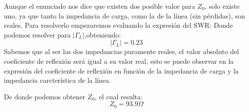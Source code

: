 Aunque el enunciado nos dice que existen dos posible valor para $Z_0$, solo existe uno, ya que tanto la impedancia de carga, como la de la línea (sin pérdidas), son reales.
Para resolverlo empezaremos evaluando la expresión del SWR:
Donde podemos resolver para $| \Gamma_L |$,obteniendo:
\[ | \Gamma_L | = 0.23 \]
Sabemos que al ser las dos impedancias puramente reales, el valor absoluto del coeficiente de reflexión será igual a su valor real, esto se puede observar en la expresión del coeficiente de reflexión en función de la impedancia de carga y la impedancia carcterística de la línea.


De donde podemos obtener $Z_0$, el cual resulta:
\[Z_0 = 93.9 \Omega \]
